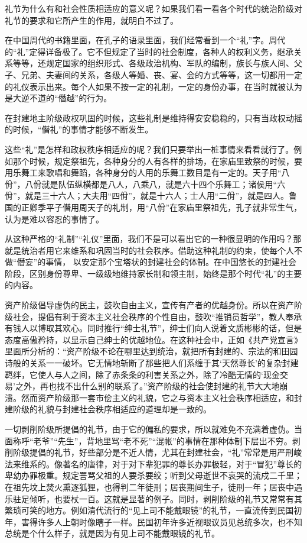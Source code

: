 \documentclass[12pt,UTF-8,openany]{ctexbook}
\begin{document}
\begin{normalsize}
    礼节为什么有和社会性质相适应的意义呢？如果我们看一看各个时代的统治阶级对礼节的要求和它所产生的作用，就明白不过了。
    
    在中国周代的书籍里面，在孔子的语录里面，我们经常看到一个“礼”字。周代的“礼”定得详备极了。它不但规定了当时的社会制度，各种人的权利义务，继承关系等等，还规定国家的组织形式、各级政治机构、军队的编制，族长与族人间、父子、兄弟、夫妻间的关系，各级人等婚、丧、宴、会的方式等等，这一切都用一定的礼仪表示出来。每个人如果不按一定的礼制，一定的身份办事，在当时就被认为是大逆不道的“僭越”的行为。
    
    在封建地主阶级政权巩固的时候，这些礼制是维持得安安稳稳的，只有当政权动摇的时候，“僭礼”的事情才能够不断发生。
    
    这些“礼”是怎样和政权秩序相适应的呢？我们只要举出一桩事情来看看就行了。例如那个时候，规定祭祖先，各种身分的人有各样的排场，在家庙里致祭的时候，要用乐舞工来歌唱和舞蹈，各种身分的人用的乐舞工数目是有一定的。天子用“八佾”，八佾就是队伍纵横都是八人，八乘八，就是六十四个乐舞工；诸侯用“六佾”，就是三十六人；大夫用“四佾”，就是十六人；士人用“二佾”，就是四人。鲁国的正卿季平子僭用周天子的礼制，用“八佾”在家庙里祭祖先，孔子就非常生气，认为是难以容忍的事情了。
    
    从这种严格的“礼制”“礼仪”里面，我们不是可以看出它的一种很显明的作用吗？那就是统治者用它来维系和巩固当时的社会秩序。借助这种礼制的约束，使每个人不做“僭妄”的事情， 以安定那个宝塔状的封建社会的体制。在中国悠长的封建社会阶段，区别身份尊卑、一级级地维持家长制和领主制，始终是那个时代“礼”的主要的内容。
    
    资产阶级倡导虚伪的民主，鼓吹自由主义，宣传有产者的优越身份。所以在资产阶级社会，提倡有利于资本主义社会秩序的个性自由，鼓吹“推销员哲学”，教人奉承有钱人以博取其欢心。同时推行“绅士礼节”，绅士们向人说着文质彬彬的话，但是态度高傲矜持，以显示自己绅士的优越地位。在这种社会中，正如《共产党宣言》里面所分析的：“资产阶级不论在哪里达到统治，就把所有封建的、宗法的和田园诗般的关系一一破坏。它无情地斩断了那些把人们系缠于其‘天然尊长’的复杂封建羁绊，它使人与人之间，除了赤条条的利害关系之外，除了冷酷无情的‘现金交易’之外，再也找不出什么别的联系了。”资产阶级的社会使封建的礼节大大地崩溃。然而资产阶级那一套市侩主义的礼貌，它之与资本主义社会秩序相适应，和封建阶级的礼貌与封建社会秩序相适应的道理却是一致的。
    
    一切剥削阶级所提倡的礼节，由于它的偏私的要求，所以就难免不充满着虚伪。当面称呼“老爷”“先生”，背地里骂“老不死”“混帐”的事情在那种体制下层出不穷。剥削阶级提倡的礼节，好些部分是不近人情，尤其在封建社会，“礼”常常是用严刑峻法来维系的。像著名的唐律，对于对下辈犯罪的尊长办罪极轻，对于“冒犯”尊长的卑幼办罪极重。规定詈骂父祖的人要杀要绞；听到父母逝世不哀哭的流戍二千里；在祖先坟上焚火熏逐狐狸，也得判二年徒刑；居丧期间生子，徒刑一年；居丧中遇乐驻足倾听，也要杖一百。这就是显著的例子。同时，剥削阶级的礼节又常常有其繁琐可笑的地方。例如清代流行的“见上司不能戴眼镜”的礼节，一直流传到民国初年，害得许多人上朝时像瞎子一样。民国初年许多近视眼议员见总统多次，也不知总统是个什么样子，就是因为有见上司不能戴眼镜的礼节。
    

\end{normalsize}
\end{document}
